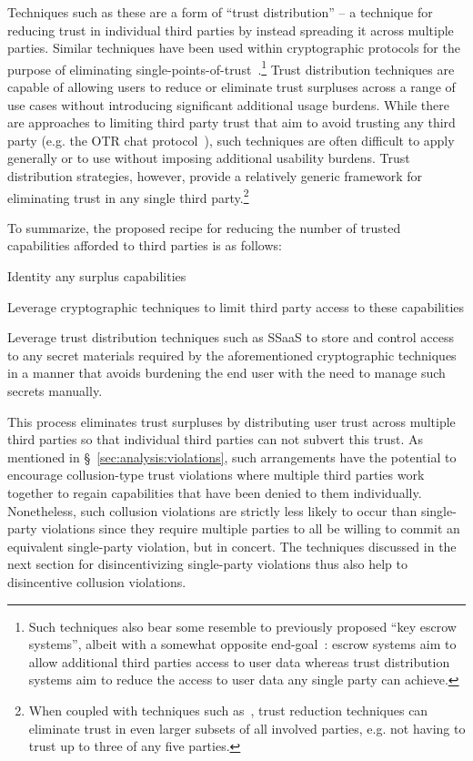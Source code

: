 Techniques such as these are a form of ``trust distribution'' -- a
technique for reducing trust in individual third parties by instead
spreading it across multiple parties. Similar techniques have been
used within cryptographic protocols for the purpose of eliminating
single-points-of-trust~\cite{shamir1979}.\footnote{Such techniques
  also bear some resemble to previously proposed ``key escrow
  systems'', albeit with a somewhat opposite
  end-goal~\cite{denning1996}: escrow systems aim to allow additional
  third parties access to user data whereas trust distribution systems
  aim to reduce the access to user data any single party can achieve.}
Trust distribution techniques are capable of allowing users to reduce
or eliminate trust surpluses across a range of use cases without
introducing significant additional usage burdens. While there are
approaches to limiting third party trust that aim to avoid trusting
any third party (e.g. the OTR chat protocol~\cite{otr-v3}), such
techniques are often difficult to apply generally or to use without
imposing additional usability burdens. Trust distribution strategies,
however, provide a relatively generic framework for eliminating trust
in any single third party.\footnote{When coupled with techniques such
  as~\cite{shamir1979}, trust reduction techniques can eliminate trust
  in even larger subsets of all involved parties, e.g. not having to
  trust up to three of any five parties.}

To summarize, the proposed recipe for reducing the number of trusted
capabilities afforded to third parties is as follows:

\begin{packed_enum}
\item Identity any surplus capabilities
\item Leverage cryptographic techniques to limit third party access to
  these capabilities
\item Leverage trust distribution techniques such as SSaaS to store
  and control access to any secret materials required by the
  aforementioned cryptographic techniques in a manner that avoids
  burdening the end user with the need to manage such secrets
  manually.
\end{packed_enum}

This process eliminates trust surpluses by distributing user trust
across multiple third parties so that individual third parties can not
subvert this trust. As mentioned in \S~\ref{sec:analysis:violations},
such arrangements have the potential to encourage collusion-type trust
violations where multiple third parties work together to regain
capabilities that have been denied to them individually. Nonetheless,
such collusion violations are strictly less likely to occur than
single-party violations since they require multiple parties to all be
willing to commit an equivalent single-party violation, but in
concert. The techniques discussed in the next section for
disincentivizing single-party violations thus also help to
disincentive collusion violations.

